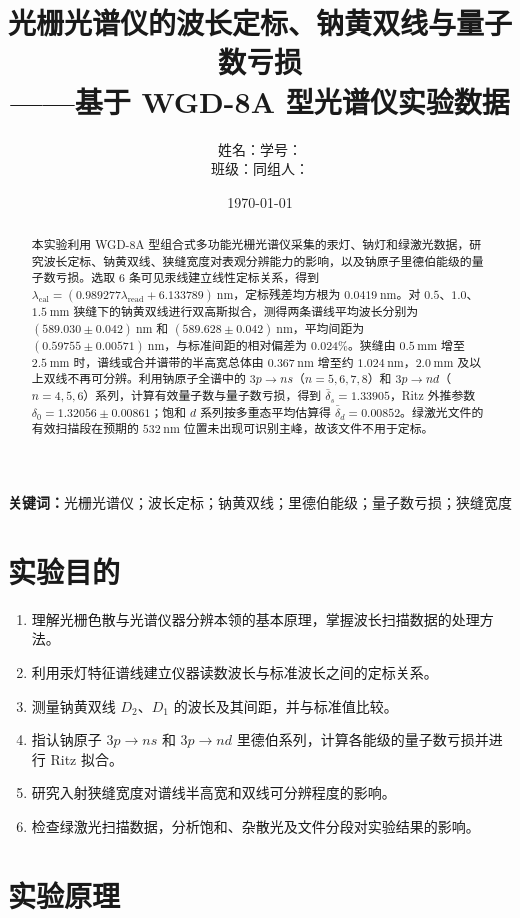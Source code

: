 \documentclass[UTF8,a4paper,11pt]{ctexart}
\title{\bfseries 光栅光谱仪的波长定标、钠黄双线与量子数亏损\\[0.4em]
\large ——基于 WGD-8A 型光谱仪实验数据}
\author{姓名：\underline{\hspace{3.0cm}}\qquad 学号：\underline{\hspace{3.0cm}}\\[0.5em]
班级：\underline{\hspace{3.0cm}}\qquad 同组人：\underline{\hspace{2.4cm}}}
\date{\today}
\begin{document}
\maketitle

\begin{abstract}
本实验利用 WGD-8A 型组合式多功能光栅光谱仪采集的汞灯、钠灯和绿激光数据，研究波长定标、钠黄双线、狭缝宽度对表观分辨能力的影响，以及钠原子里德伯能级的量子数亏损。选取 6 条可见汞线建立线性定标关系，得到 $\lambda_{\mathrm{cal}}=(0.989277\lambda_{\mathrm{read}}+6.133789)\ \mathrm{nm}$，定标残差均方根为 $0.0419\ \mathrm{nm}$。对 $0.5$、$1.0$、$1.5\ \mathrm{mm}$ 狭缝下的钠黄双线进行双高斯拟合，测得两条谱线平均波长分别为 $(589.030\pm0.042)\ \mathrm{nm}$ 和 $(589.628\pm0.042)\ \mathrm{nm}$，平均间距为 $(0.59755\pm0.00571)\ \mathrm{nm}$，与标准间距的相对偏差为 $0.024\%$。狭缝由 $0.5\ \mathrm{mm}$ 增至 $2.5\ \mathrm{mm}$ 时，谱线或合并谱带的半高宽总体由 $0.367\ \mathrm{nm}$ 增至约 $1.024\ \mathrm{nm}$，$2.0\ \mathrm{mm}$ 及以上双线不再可分辨。利用钠原子全谱中的 $3p\to ns$（$n=5,6,7,8$）和 $3p\to nd$（$n=4,5,6$）系列，计算有效量子数与量子数亏损，得到 $\bar\delta_s=1.33905$，Ritz 外推参数 $\delta_0=1.32056\pm0.00861$；饱和 $d$ 系列按多重态平均估算得 $\bar\delta_d=0.00852$。绿激光文件的有效扫描段在预期的 $532\ \mathrm{nm}$ 位置未出现可识别主峰，故该文件不用于定标。
\end{abstract}

\noindent\textbf{关键词：}光栅光谱仪；波长定标；钠黄双线；里德伯能级；量子数亏损；狭缝宽度

\section{实验目的}
\begin{enumerate}
  \item 理解光栅色散与光谱仪器分辨本领的基本原理，掌握波长扫描数据的处理方法。
  \item 利用汞灯特征谱线建立仪器读数波长与标准波长之间的定标关系。
  \item 测量钠黄双线 $D_2$、$D_1$ 的波长及其间距，并与标准值比较。
  \item 指认钠原子 $3p\to ns$ 和 $3p\to nd$ 里德伯系列，计算各能级的量子数亏损并进行 Ritz 拟合。
  \item 研究入射狭缝宽度对谱线半高宽和双线可分辨程度的影响。
  \item 检查绿激光扫描数据，分析饱和、杂散光及文件分段对实验结果的影响。
\end{enumerate}

\section{实验原理}
\end{document}
